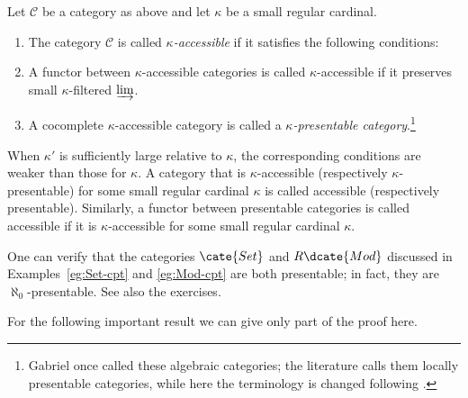 \begin{definition}\label{def:presentable-cat}
	Let $\mathcal{C}$ be a category as above and let $\kappa$ be a small regular cardinal.
	\begin{enumerate}
		\item The category $\mathcal{C}$ is called \emph{$\kappa$-accessible} if it satisfies the following conditions:
		\item A functor between $\kappa$-accessible categories is called $\kappa$-accessible if it preserves small $\kappa$-filtered $\varinjlim$.
		\item A cocomplete $\kappa$-accessible category is called a \emph{$\kappa$-presentable category}.\footnote{Gabriel once called these algebraic categories; the literature \cite{AR94, GU71} calls them locally presentable categories, while here the terminology is changed following \cite[A.1.1]{Lu09}.}
	\end{enumerate}

	When $\kappa'$ is sufficiently large relative to $\kappa$, the corresponding conditions are weaker than those for $\kappa$. A category that is $\kappa$-accessible (respectively $\kappa$-presentable) for some small regular cardinal $\kappa$ is called accessible (respectively presentable). Similarly, a functor between presentable categories is called accessible if it is $\kappa$-accessible for some small regular cardinal $\kappa$.
\end{definition}

One can verify that the categories $\cate{Set}$ and $R\dcate{Mod}$ discussed in Examples~\ref{eg:Set-cpt} and \ref{eg:Mod-cpt} are both presentable; in fact, they are $\aleph_0$-presentable. See also the exercises.

For the following important result we can give only part of the proof here.

